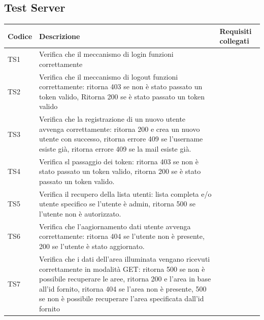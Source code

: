\documentclass[a4paper, 12pt]{article}
\begin{document}
\subsection*{Test Server}
\setlength\tabcolsep{4pt}
\begin{center}
	\begin{tabularx}{\textwidth}{|X|X|X|}
	\hline
		\textbf{Codice} & \textbf{Descrizione } & \textbf{Requisiti collegati } \\
		\hline
		TS1 & Verifica che il meccanismo di login funzioni correttamente   &        \\
		\hline
		TS2 &  Verifica che il meccanismo di logout funzioni correttamente: ritorna 403 se non è stato passato un token valido, Ritorna 200 se è stato passato un token valido    &       \\
		\hline
		TS3 & Verifica che la registrazione di un nuovo utente avvenga correttamente: ritorna 200 e crea un nuovo utente con successo, ritorna errore 409 se l'username esiste già, ritorna errore 409 se la mail esiste già. &  \\
		\hline
		TS4 &  Verifica sl passaggio dei token: ritorna 403 se non è stato passato un token valido, ritorna 200 se è stato passato un token valido.  & \\
		\hline
		TS5 & Verifica il recupero della lista utenti: lista completa e/o utente specifico se l'utente è admin, ritorna 500 se l'utente non è autorizzato.   &  \\
		\hline
		TS6 & Verifica che l'aagiornamento dati utente avvenga correttamente: ritorna 404 se l'utente non è presente, 200 se l'utente è stato aggiornato. &  \\
		\hline
		TS7 & Verifica che i dati dell'area illuminata vengano ricevuti correttamente in modalità GET: ritorna 500 se non è possibile recuperare le aree, ritorna 200 e l'area in base all'id fornito, ritorna 404 se l'area non è presente, 500 se non è possibile recuperare l'area specificata dall'id fornito &  \\
		\hline
	\end{tabularx}\\[8pt]
	\mbox{}\\
\end{center}
		
\end{document}
